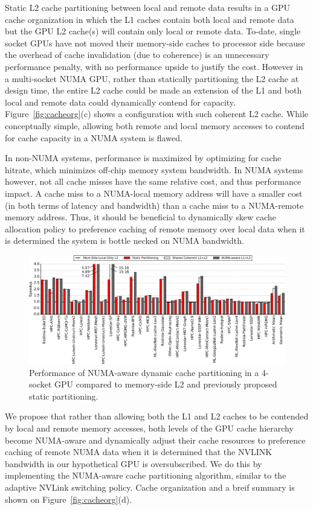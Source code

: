 Static L2 cache partitioning between local and remote data results in a GPU cache
organization in which the L1 caches contain both local and remote data but the GPU
L2 cache(s) will contain only local or remote data.  To-date, single socket GPUs
have not moved their memory-side caches to processor side because the overhead of
cache invalidation (due to coherence) is an unnecessary performance penalty, with
no performance upside to justify the cost.  However in a multi-socket NUMA GPU,
rather than statically partitioning the L2 cache at design time, the entire L2 cache
could be made an extension of the L1 and both local and remote data could dynamically
contend for capacity. Figure~\ref{fig:cacheorg}(c) shows a configuration with such coherent L2 cache. While conceptually simple, allowing both remote and local
memory accesses to contend for cache capacity in a NUMA system is flawed.

In non-NUMA systems, performance is maximized by optimizing for cache hitrate, which
minimizes off-chip memory system bandwidth.  In NUMA systems however, not all cache
misses have the same relative cost, and thus performance impact.  A cache miss to a 
NUMA-local memory address will have a smaller cost (in both terms of latency and bandwidth)
than a cache miss to a NUMA-remote memory address.  Thus, it should be beneficial
to dynamically skew cache allocation policy to preference caching of remote memory over local
data when it is determined the system is bottle necked on NUMA bandwidth.


\begin{figure}[t]
    \centering
    \includegraphics[width=1.0\textwidth]{figures/plot_merged_cache_WB.pdf}
    \caption{Performance of NUMA-aware dynamic cache partitioning in a 4-socket GPU compared to memory-side L2 and previously proposed static partitioning.}
    \label{fig:dynamiccaching}
\end{figure}

We propose that rather than allowing both the L1 and L2 caches to be contended by local
and remote memory accesses,  both levels of the GPU cache hierarchy become NUMA-aware
and dynamically adjust their cache resources to preference caching of remote NUMA
data when it is determined that the NVLINK bandwidth in our hypothetical GPU is
oversubscribed.  We do this by implementing the NUMA-aware cache partitioning
algorithm, similar to the adaptive NVLink switching policy. Cache organization and a breif summary is shown on Figure~\ref{fig:cacheorg}(d).

